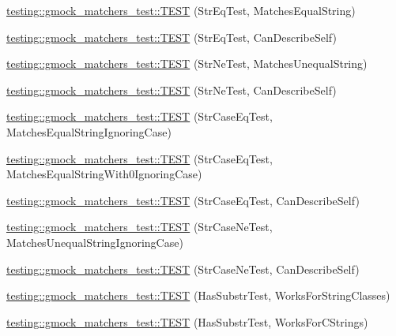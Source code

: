 \begin{DoxyCompactItemize}
\item 
\hyperlink{namespacetesting_1_1gmock__matchers__test_a5956b46686ad29d2d29b313bce9eba8a}{testing\+::gmock\+\_\+matchers\+\_\+test\+::\+T\+E\+ST} (Str\+Eq\+Test, Matches\+Equal\+String)
\item 
\hyperlink{namespacetesting_1_1gmock__matchers__test_a1cb9d74bdf937816807e91b842b22c75}{testing\+::gmock\+\_\+matchers\+\_\+test\+::\+T\+E\+ST} (Str\+Eq\+Test, Can\+Describe\+Self)
\item 
\hyperlink{namespacetesting_1_1gmock__matchers__test_a3c0a0ca54e3d34c55bd30c2b5572d902}{testing\+::gmock\+\_\+matchers\+\_\+test\+::\+T\+E\+ST} (Str\+Ne\+Test, Matches\+Unequal\+String)
\item 
\hyperlink{namespacetesting_1_1gmock__matchers__test_a4daef0c28c6b07cb3d6a6306c05599b0}{testing\+::gmock\+\_\+matchers\+\_\+test\+::\+T\+E\+ST} (Str\+Ne\+Test, Can\+Describe\+Self)
\item 
\hyperlink{namespacetesting_1_1gmock__matchers__test_ae0c0b82b3895923747dc70cb9339a8dc}{testing\+::gmock\+\_\+matchers\+\_\+test\+::\+T\+E\+ST} (Str\+Case\+Eq\+Test, Matches\+Equal\+String\+Ignoring\+Case)
\item 
\hyperlink{namespacetesting_1_1gmock__matchers__test_aa159c9a52c6dc18cb7f214fbb5bddece}{testing\+::gmock\+\_\+matchers\+\_\+test\+::\+T\+E\+ST} (Str\+Case\+Eq\+Test, Matches\+Equal\+String\+With0\+Ignoring\+Case)
\item 
\hyperlink{namespacetesting_1_1gmock__matchers__test_ab4fb6542ea3a7789850668a9266a80ef}{testing\+::gmock\+\_\+matchers\+\_\+test\+::\+T\+E\+ST} (Str\+Case\+Eq\+Test, Can\+Describe\+Self)
\item 
\hyperlink{namespacetesting_1_1gmock__matchers__test_a9a627f8538cfff62fbaee86ac465f6c8}{testing\+::gmock\+\_\+matchers\+\_\+test\+::\+T\+E\+ST} (Str\+Case\+Ne\+Test, Matches\+Unequal\+String\+Ignoring\+Case)
\item 
\hyperlink{namespacetesting_1_1gmock__matchers__test_ae953891c7961b6ffd51dc712be8d24de}{testing\+::gmock\+\_\+matchers\+\_\+test\+::\+T\+E\+ST} (Str\+Case\+Ne\+Test, Can\+Describe\+Self)
\item 
\hyperlink{namespacetesting_1_1gmock__matchers__test_a2a1043a0b8bfb4bc0b5fb539317132a3}{testing\+::gmock\+\_\+matchers\+\_\+test\+::\+T\+E\+ST} (Has\+Substr\+Test, Works\+For\+String\+Classes)
\item 
\hyperlink{namespacetesting_1_1gmock__matchers__test_a147dde340ba8f77308cd116d3bb831d6}{testing\+::gmock\+\_\+matchers\+\_\+test\+::\+T\+E\+ST} (Has\+Substr\+Test, Works\+For\+C\+Strings)

\end{DoxyCompactItemize}
